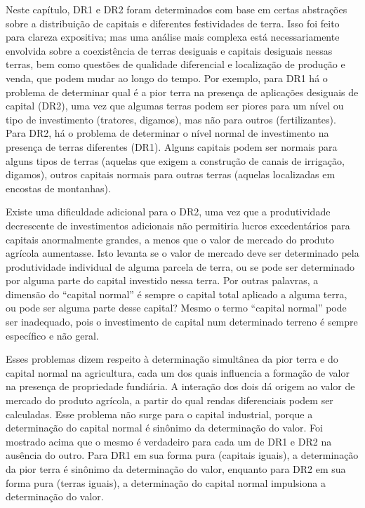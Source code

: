  \par 
Neste capítulo, DR1 e DR2 foram determinados com base em certas abstrações sobre a distribuição de capitais e diferentes festividades de terra. Isso foi feito para clareza expositiva; mas uma análise mais complexa está necessariamente envolvida sobre a coexistência de terras desiguais e capitais desiguais nessas terras, bem como questões de qualidade diferencial e localização de produção e venda, que podem mudar ao longo do tempo. Por exemplo, para DR1 há o problema de determinar qual é a pior terra na presença de aplicações desiguais de capital (DR2), uma vez que algumas terras podem ser piores para um nível ou tipo de investimento (tratores, digamos), mas não para outros (fertilizantes). Para DR2, há o problema de determinar o nível normal de investimento na presença de terras diferentes (DR1). Alguns capitais podem ser normais para alguns tipos de terras (aquelas que exigem a construção de canais de irrigação, digamos), outros capitais normais para outras terras (aquelas localizadas em encostas de montanhas).
 \par 
Existe uma dificuldade adicional para o DR2, uma vez que a produtividade decrescente de investimentos adicionais não permitiria lucros excedentários para capitais anormalmente grandes, a menos que o valor de mercado do produto agrícola aumentasse. Isto levanta se o valor de mercado deve ser determinado pela produtividade individual de alguma parcela de terra, ou se pode ser determinado por alguma parte do capital investido nessa terra. Por outras palavras, a dimensão do “capital normal” é sempre o capital total aplicado a alguma terra, ou pode ser alguma parte desse capital? Mesmo o termo “capital normal” pode ser inadequado, pois o investimento de capital num determinado terreno é sempre específico e não geral.
 \par 
Esses problemas dizem respeito à determinação simultânea da pior terra e do capital normal na agricultura, cada um dos quais influencia a formação de valor na presença de propriedade fundiária. A interação dos dois dá origem ao valor de mercado do produto agrícola, a partir do qual rendas diferenciais podem ser calculadas. Esse problema não surge para o capital industrial, porque a determinação do capital normal é sinônimo da determinação do valor. Foi mostrado acima que o mesmo é verdadeiro para cada um de DR1 e DR2 na ausência do outro. Para DR1 em sua forma pura (capitais iguais), a determinação da pior terra é sinônimo da determinação do valor, enquanto para DR2 em sua forma pura (terras iguais), a determinação do capital normal impulsiona a determinação do valor.
